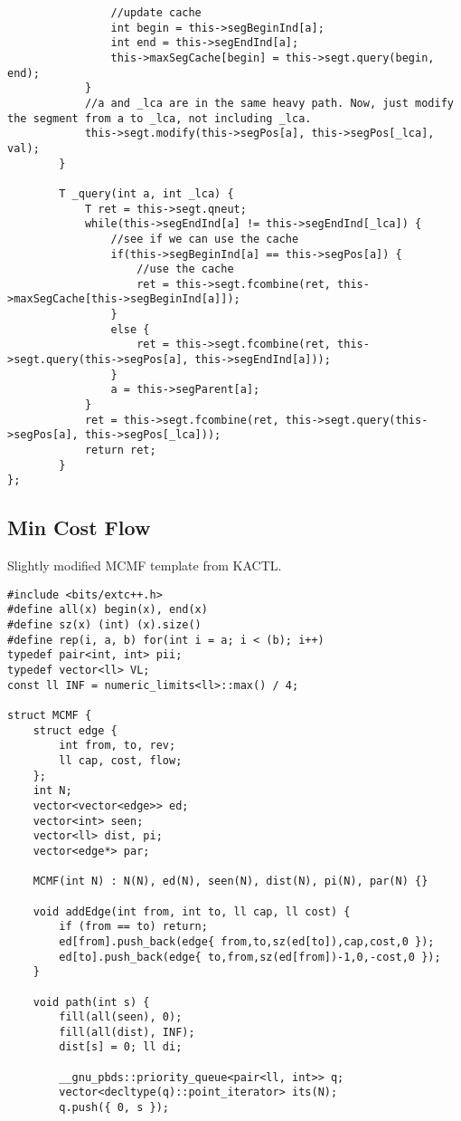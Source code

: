 \documentclass[8pt, headheight=10pt]{scrartcl}
\begin{document}
\begin{multicols*}{3}
\begin{lstlisting}
                //update cache
                int begin = this->segBeginInd[a];
                int end = this->segEndInd[a];
                this->maxSegCache[begin] = this->segt.query(begin, end);
            }
            //a and _lca are in the same heavy path. Now, just modify the segment from a to _lca, not including _lca. 
            this->segt.modify(this->segPos[a], this->segPos[_lca], val);
        }

        T _query(int a, int _lca) {
            T ret = this->segt.qneut;
            while(this->segEndInd[a] != this->segEndInd[_lca]) {
                //see if we can use the cache
                if(this->segBeginInd[a] == this->segPos[a]) {
                    //use the cache
                    ret = this->segt.fcombine(ret, this->maxSegCache[this->segBeginInd[a]]);
                }
                else {
                    ret = this->segt.fcombine(ret, this->segt.query(this->segPos[a], this->segEndInd[a]));
                }
                a = this->segParent[a];
            }
            ret = this->segt.fcombine(ret, this->segt.query(this->segPos[a], this->segPos[_lca]));
            return ret;
        }
};
\end{lstlisting}

\subsection{Min Cost Flow}
Slightly modified MCMF template from KACTL.
\begin{lstlisting}
#include <bits/extc++.h>
#define all(x) begin(x), end(x)
#define sz(x) (int) (x).size()
#define rep(i, a, b) for(int i = a; i < (b); i++)
typedef pair<int, int> pii;
typedef vector<ll> VL;
const ll INF = numeric_limits<ll>::max() / 4;

struct MCMF {
	struct edge {
		int from, to, rev;
		ll cap, cost, flow;
	};
	int N;
	vector<vector<edge>> ed;
	vector<int> seen;
	vector<ll> dist, pi;
	vector<edge*> par;

	MCMF(int N) : N(N), ed(N), seen(N), dist(N), pi(N), par(N) {}

	void addEdge(int from, int to, ll cap, ll cost) {
		if (from == to) return;
		ed[from].push_back(edge{ from,to,sz(ed[to]),cap,cost,0 });
		ed[to].push_back(edge{ to,from,sz(ed[from])-1,0,-cost,0 });
	}

	void path(int s) {
		fill(all(seen), 0);
		fill(all(dist), INF);
		dist[s] = 0; ll di;

		__gnu_pbds::priority_queue<pair<ll, int>> q;
		vector<decltype(q)::point_iterator> its(N);
		q.push({ 0, s });


\end{lstlisting}
\end{multicols*}
\end{document}
